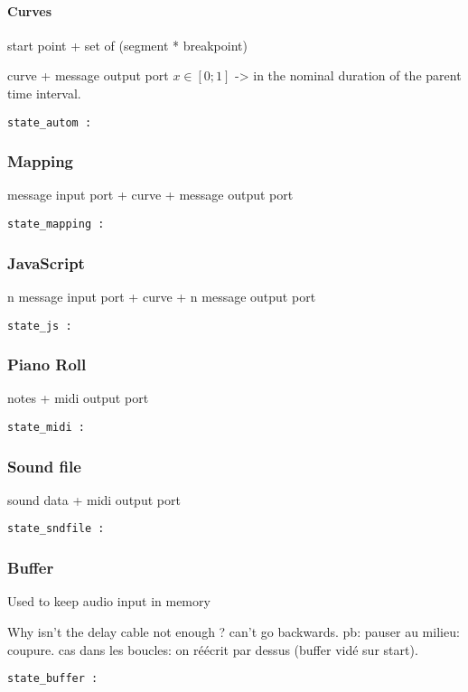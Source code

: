 \documentclass[applsci,article,submit,moreauthors,pdftex,10pt,a4paper]{mdpi}
\begin{document}
\paragraph{Curves}
start point + set of (segment * breakpoint)

curve + message output port
$x\in[0;1]$ -> in the nominal duration of the parent time interval.

\begin{lstlisting}
state_autom :
\end{lstlisting}
\subsubsection{Mapping}
message input port + curve + message output port
\begin{lstlisting}
state_mapping :
\end{lstlisting}
\subsubsection{JavaScript}
n message input port + curve + n message output port
\begin{lstlisting}
state_js :
\end{lstlisting}
\subsubsection{Piano Roll}
notes + midi output port
\begin{lstlisting}
state_midi :
\end{lstlisting}
\subsubsection{Sound file}
sound data + midi output port
\begin{lstlisting}
state_sndfile :
\end{lstlisting}
\subsubsection{Buffer}
Used to keep audio input in memory

Why isn't the delay cable not enough ? can't go backwards. 
pb: pauser au milieu: coupure. cas dans les boucles: on réécrit par dessus (buffer vidé sur start).
\begin{lstlisting}
state_buffer :
\end{lstlisting}
\end{document}
